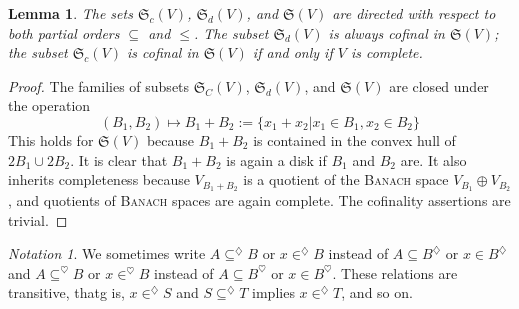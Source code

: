 \documentclass{article}
\theoremstyle{plain}
\newtheorem{lemma}[equation]{Lemma}
\theoremstyle{remark}
\newtheorem{notation}[equation]{Notation}
\begin{document}
    \begin{lemma}
        The sets $\mathfrak{S}_c(V)$, $\mathfrak{S}_d(V)$, and 
			$\mathfrak{S}(V)$ are directed with respect to both partial orders 
			$\subseteq$ and $\leq$. The subset $\mathfrak{S}_d(V)$ is always 
			cofinal in $\mathfrak{S}(V)$; the subset $\mathfrak{S}_c(V)$ is cofinal 
			in $\mathfrak{S}(V)$ if and only if $V$ is complete.
    \end{lemma}
    \begin{proof}
        The families of subsets $\mathfrak{S}_C(V)$, $\mathfrak{S}_d(V)$, and 
			$\mathfrak{S}(V)$ are closed under the operation
        \[(B_1,B_2)\mapsto B_1+B_2 := \lbrace{x_1+x_2\vert x_1 \in B_1, x_2 \in B_2\rbrace}\]
        This holds for $\mathfrak{S}(V)$ because $B_1+B_2$ is contained in the 
			convex hull of $2B_1\cup 2B_2$. It is clear that $B_1+B_2$ is again a 
			disk if $B_1$ and $B_2$ are. It also inherits completeness because 
			$V_{B_1+B_2}$ is a quotient of the {\scshape Banach} space 
			$V_{B_1}\oplus V_{B_2}$, and quotients of {\scshape Banach} spaces are 
			again complete. The cofinality assertions are trivial.\qedhere
    \end{proof}

	\begin{notation}
		We sometimes write $A\subseteq^\diamondsuit B$ or $x\in^\diamondsuit B$
		instead of $A\subseteq B^\diamondsuit$ or $x\in B^\diamondsuit$ and
		$A\subseteq^\heartsuit B$ or $x\in^\heartsuit B$ instead of 
		$A\subseteq B^\heartsuit$ or $x\in B^\heartsuit$. These relations are 
		transitive, thatg is, $x\in^\diamondsuit S$ and 
		$S\subseteq^\diamondsuit T$ implies $x\in^\diamondsuit T$, and so on.
	\end{notation}
\end{document}

